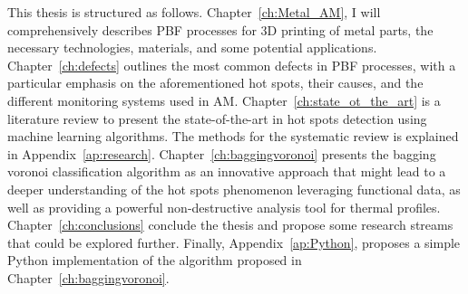 This thesis is structured as follows. Chapter~\ref{ch:Metal_AM}, I will comprehensively describes PBF processes for 3D printing of metal parts, the necessary technologies, materials, and some potential applications. Chapter~\ref{ch:defects} outlines the most common defects in PBF processes, with a particular emphasis on the aforementioned hot spots, their causes, and the different monitoring systems used in AM. Chapter~\ref{ch:state_ot_the_art} is a literature review to present the state-of-the-art in hot spots detection using machine learning algorithms. The methods for the systematic review is explained in Appendix~\ref{ap:research}. Chapter~\ref{ch:baggingvoronoi} presents the bagging voronoi classification algorithm as an innovative approach that might lead to a deeper understanding of the hot spots phenomenon leveraging functional data, as well as providing a powerful non-destructive analysis tool for thermal profiles. Chapter~\ref{ch:conclusions} conclude the thesis and propose some research streams that could be explored further. Finally, Appendix~\ref{ap:Python}, proposes a simple Python \cite{python_software_foundation_python_2023} implementation of the algorithm proposed in Chapter~\ref{ch:baggingvoronoi}.
